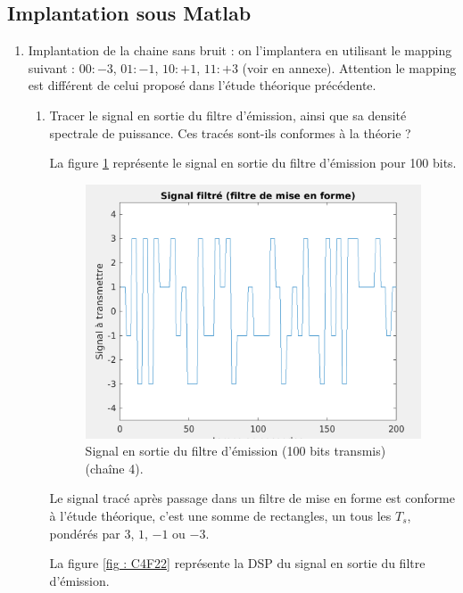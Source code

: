 \documentclass[frenchb]{article}
\begin{document}
\subsection{Implantation sous Matlab}
\begin{enumerate}
        \item Implantation de la chaine sans bruit : on l'implantera en utilisant le mapping suivant : $00: -3$,  $01: -1$, $10: +1$,  $11: +3$ (voir en annexe). Attention le mapping est différent de celui proposé dans l'étude théorique précédente.
            \begin{enumerate}
                \item Tracer le signal en sortie du filtre d'émission, ainsi que sa densité spectrale de puissance. Ces tracés sont-ils conformes à la théorie ?
                \par\leavevmode\par
                \setlength\parindent{0.5cm}
                La figure \ref{fig : C4F12} représente  le signal en sortie du filtre d'émission pour 100 bits.
        
                 \begin{figure}[ht!]
		         \centering
		         \includegraphics[width=10cm]{C4F12.png}		              			     \caption{Signal en sortie du filtre d'émission (100 bits transmis)(chaîne 4). \label{fig : C4F12}}
		         \end{figure}
		         
		        
		         \newpage
		         Le signal tracé après passage dans un filtre de mise en forme est conforme à l'étude théorique, c'est une somme de rectangles, un tous les $T_s$, pondérés par $3$, $1$, $-1$ ou $-3$.
		         
		         La figure \ref{fig : C4F22} représente la DSP du signal en sortie du filtre d'émission. 
		         

\end{enumerate}
\end{enumerate}
\end{document}
